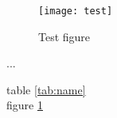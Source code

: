 \documentclass{book}
\begin{document}
\begin{figure}
  \centering
  \texttt{[image: test]}
  \caption{Test figure}\label{fig:name}
\end{figure}

\begin{table}[hbp]
  \centering
  \begin{tabular}{}
    ...
  \end{tabular}
  \caption{table description}
  \label{tab:name}
\end{table}


table \ref{tab:name}\\
figure \ref{fig:name}
\end{document}
